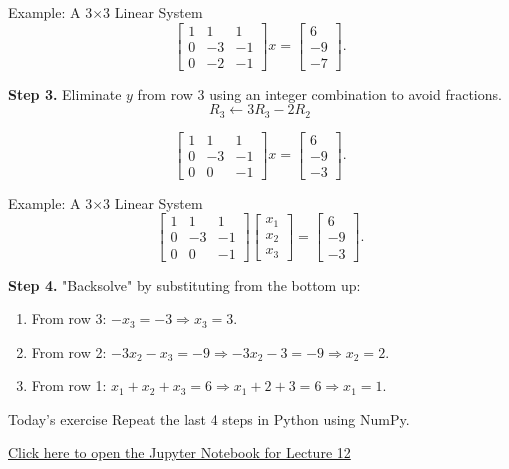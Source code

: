 \documentclass{beamer}
\begin{document}
\begin{frame}{Example: A 3$\times$3 Linear System}
\[
\left[
\begin{array}{ccc}
1 & 1 & 1 \\
0 & -3 & -1 \\
0 & -2 & -1 
\end{array}
\right] x =
\left[
\begin{array}{c}
6 \\
-9 \\
-7
\end{array}
\right].
\]

\textbf{Step 3.} Eliminate \(y\) from row 3 using an integer combination to avoid fractions.
\[
R_3 \leftarrow 3R_3 - 2R_2
\]

\[
\left[
\begin{array}{ccc}
1 & 1 & 1 \\
0 & -3 & -1 \\
0 & 0 & -1 
\end{array}
\right] x =
\left[
\begin{array}{c}
6 \\
-9 \\
-3
\end{array}
\right].
\]
\end{frame}

\begin{frame}{Example: A 3$\times$3 Linear System}
\[
\left[
\begin{array}{ccc}
1 & 1 & 1 \\
0 & -3 & -1 \\
0 & 0 & -1 
\end{array}
\right]
\left[
\begin{array}{c}
x_1  \\
x_2  \\
x_3
\end{array}
\right]
 =
\left[
\begin{array}{c}
6 \\
-9 \\
-3
\end{array}
\right].
\]

\textbf{Step 4.} "Backsolve" by substituting from the bottom up:
\begin{enumerate}
    \item From row 3: 
    \(-x_3 = -3 \Rightarrow x_3 = 3\).
    \item From row 2: 
    \(-3x_2 - x_3 = -9 \Rightarrow -3x_2 - 3 = -9 \Rightarrow x_2 = 2\).
    \item From row 1: 
    \(x_1 + x_2 + x_3 = 6 \Rightarrow x_1 + 2 + 3 = 6 \Rightarrow x_1 = 1\).
\end{enumerate}

\end{frame}

\begin{frame}{Today's exercise}
Repeat the last 4 steps in Python using NumPy.

\href{../notebooks/lec12.ipynb}{Click here to open the Jupyter Notebook for Lecture 12}
\end{frame}
\end{document}
